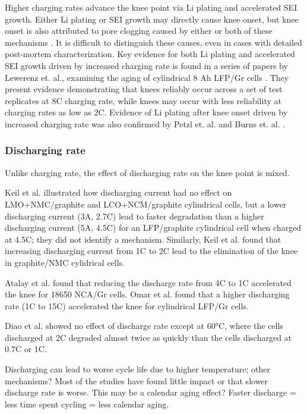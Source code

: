 \documentclass{article}
\begin{document}
Higher charging rates advance the knee point via Li plating and accelerated SEI growth. Either Li plating or SEI growth may directly cause knee onset, but knee onset is also attributed to pore clogging caused by either or both of these mechanisms \cite{yang_modeling_2017}. It is difficult to distinguish these causes, even in cases with detailed post-mortem characterization. Key evidence for both Li plating and accelerated SEI growth driven by increased charging rate is found in a series of papers by Lewerenz et. al., examining the aging of cylindrical 8 Ah LFP/Gr cells \cite{lewerenz_systematic_2017,lewerenz_post-mortem_2017}. They present evidence demonstrating that knees reliably occur across a set of test replicates at 8C charging rate, while knees may occur with less reliability at charging rates as low as 2C. Evidence of Li plating after knee onset driven by increased charging rate was also confirmed by Petzl et. al. \cite{petzl_lithium_2015} and Burns et. al. \cite{burns_-situ_2015}. 



\subsubsection{Discharging rate}

Unlike charging rate, the effect of discharging rate on the knee point is mixed.

Keil et al.\cite{keil_charging_2016} illustrated how discharging current had no effect on LMO+NMC/graphite and LCO+NCM/graphite cylindrical cells, but a lower discharging current (3A, 2.7C) lead to faster degradation than a higher discharging current (5A, 4.5C) for an LFP/graphite cylindrical cell when charged at 4.5C; they did not identify a mechanism. 
Similarly, Keil et al.\cite{keil_linear_2019} found that increasing discharging current from 1C to 2C lead to the elimination of the knee in graphite/NMC cylidrical cells.

Atalay et al.\cite{atalay_theory_2020} found that reducing the discharge rate from 4C to 1C accelerated the knee for 18650 NCA/Gr cells.
Omar et al. \cite{omar_lithium_2014} found that a higher discharging rate (1C to 15C) accelerated the knee for cylindrical LFP/Gr cells.

Diao et al.\cite{diao_accelerated_2019} showed no effect of discharge rate except at 60°C, where the cells discharged at 2C degraded almost twice as quickly than the cells discharged at 0.7C or 1C. 

Discharging can lead to worse cycle life due to higher temperature; other mechanisms? Most of the studies have found little impact or that slower discharge rate is worse. This may be a calendar aging effect? Faster discharge = less time spent cycling = less calendar aging. 
\end{document}

